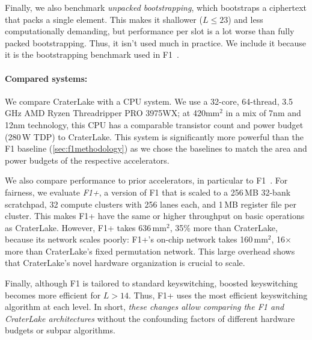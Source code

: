 Finally, we also benchmark \emph{unpacked bootstrapping}, which bootstraps a
ciphertext that packs a single element. This makes it shallower ($L{\leq}23$)
and less computationally demanding, but performance per slot is a lot worse
than fully packed bootstrapping. Thus, it isn't used much in practice. We
include it because it is the bootstrapping benchmark used in
F1~\cite{feldmann:micro21:f1}.

\paragraph{Compared systems:}
We compare CraterLake with a CPU system. We use a 32-core, 64-thread, 3.5\,GHz
AMD Ryzen Threadripper PRO 3975WX; at 420mm$^2$ in a mix of 7nm and 12nm
technology, this CPU has a comparable transistor count and power budget (280\,W
TDP) to CraterLake. This system is significantly more powerful than the F1
baseline (\autoref{sec:f1methodology}) as we chose the baselines to match the
area and power budgets of the respective accelerators.

We also compare performance to prior accelerators, in particular to
F1~\cite{feldmann:micro21:f1}. For fairness, we evaluate \emph{F1+}, a version
of F1 that is scaled to a 256\,MB 32-bank scratchpad, 32 compute clusters with
256 lanes each, and 1\,MB register file per cluster. This makes F1+ have the
same or higher throughput on basic operations as CraterLake. However, F1+ takes
636\,mm$^2$, 35\% more than CraterLake, because its network scales poorly:
F1+'s on-chip network takes 160\,mm$^2$, 16$\times$ more than CraterLake's
fixed permutation network. This large overhead shows that CraterLake's novel
hardware organization is crucial to scale.

Finally, although F1 is tailored to standard keyswitching, boosted keyswitching
becomes more efficient for $L>14$. Thus, F1+ uses the most efficient
keyswitching algorithm at each level. In short, \emph{these changes allow
comparing the F1 and CraterLake architectures} without the confounding factors of
different hardware budgets or subpar algorithms.

